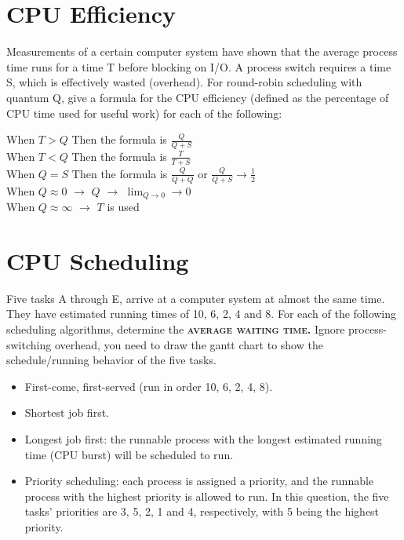 \documentclass{article}
\begin{document}
    \section*{CPU Efficiency}
    Measurements of a certain computer system have shown that the average process time runs for a time T before blocking on I/O. A process switch requires a time S, which is effectively wasted (overhead). For round-robin scheduling with quantum Q, give a formula for the CPU efficiency (defined as the percentage of CPU time used for useful work) for each of the following:

    \begin{center}
      When $T > Q$ Then the formula is $\frac{Q}{Q+S}$ \\
      When $T < Q$ Then the formula is $\frac{T}{T+S}$ \\
      When $Q = S$ Then the formula is $\frac{Q}{Q+Q}$ or $\frac{Q}{Q+S} \to \frac{1}{2}$\\
      When $Q \approx 0$ $\to$ $Q$ $\to$ $\lim_{Q\to0} \to 0$\\
      When $Q \approx \infty$ $\to$ $T$ is used \\
    \end{center}

    \section*{CPU Scheduling}
    Five tasks A through E, arrive at a computer system at almost the same time.
    They have estimated running times of 10, 6, 2, 4 and 8. For each of the following scheduling algorithms, determine the \textsc{\textbf{average waiting time.}} Ignore process-switching overhead, you need to draw the gantt chart to show the schedule/running behavior of the five tasks.

    \begin{itemize}
      \item First-come, first-served (run in order 10, 6, 2, 4, 8).
      \item Shortest job first.
      \item Longest job first: the runnable process with the longest estimated running time (CPU burst) will be scheduled to run.
      \item Priority scheduling: each process is assigned a priority, and the runnable process with the highest priority is allowed to run. In this question, the five tasks' priorities are 3, 5, 2, 1 and 4, respectively, with 5 being the highest priority.
    \end{itemize}
\end{document}
